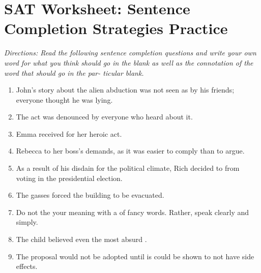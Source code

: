 \section{SAT Worksheet: Sentence Completion Strategies Practice}

\textit{Directions: Read the following sentence completion questions and write your own word for what
you think should go in the blank as well as the connotation of the word that should go in the par-
ticular blank.} 

\begin{enumerate}
\item John’s story about the alien abduction was not seen as by \underline{\hspace{2in}} his friends; everyone thought he was lying.

\item The \underline{\hspace{2in}} act was denounced by everyone who heard about it.

\item Emma received \underline{\hspace{2in}} for her heroic act.

\item Rebecca \underline{\hspace{2in}} to her boss’s demands, as it was easier to comply than to argue.

\item As a result of his disdain for the political climate, Rich decided to \underline{\hspace{2in}} from voting in the presidential election.

\item The \underline{\hspace{2in}} gasses forced the building to be evacuated.

\item Do not \underline{\hspace{2in}} the your meaning with a \underline{\hspace{2in}} of fancy words. Rather, speak clearly and simply. 

\item The \underline{\hspace{2in}} child believed even the  most absurd \underline{\hspace{2in}}.

\item The \underline{\hspace{2in}} proposal would not be adopted until is could be shown to not have \underline{\hspace{2in}} side effects.
  
  \end{enumerate}
  